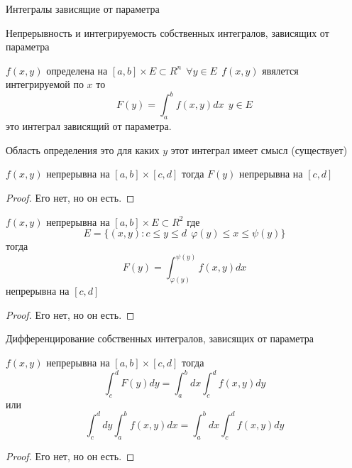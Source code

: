 \begin{title}
  Интегралы зависящие от параметра
\end{title}

\begin{title}[\Large]
  Непрерывность и интегрируемость собственных интегралов, зависящих от
  параметра
\end{title}

\begin{define}
  $f(x,y)$ определена на $[a,b] \times E \subset R^n ~~ \forall y \in E ~~
  f(x,y)$ явялется интегрируемой по $x$ то
  $$
  F(y) = \int_a^b f(x,y) dx ~~ y \in E
  $$
  это интеграл зависящий от параметра.

  Область определения это для каких $y$ этот интеграл имеет смысл (существует)
\end{define}

\begin{theorem}
  $f(x,y)$ непрерывна на $[a,b] \times [c,d]$ тогда $F(y)$ непрерывна
  на $[c,d]$
\end{theorem}

\begin{proof}
  Его нет, но он есть.
\end{proof}

\begin{theorem}
  $f(x,y)$ непрерывна на $[a,b] \times E \subset R^2$ где
  $$
  E = \{ (x,y): c \le y \le d ~~ \varphi(y) \le x \le \psi(y) \}
  $$
  тогда
  $$
  F(y) = \int_{\varphi(y)}^{\psi(y)} f(x,y) dx
  $$
  непрерывна на $[c,d]$
\end{theorem}

\begin{proof}
  Его нет, но он есть.
\end{proof}

\begin{title}[\Large]
  Дифференцирование собственных интегралов, зависящих от параметра
\end{title}

\begin{theorem}
  $f(x,y)$ непрерывна на $[a,b] \times [c,d]$ тогда
  $$
  \int_c^d F(y) dy = \int_a^b dx \int_c^d f(x,y) dy
  $$
  или
  $$
  \int_c^d dy \int_a^b f(x,y) dx = \int_a^b dx \int_c^d f(x,y) dy
  $$
\end{theorem}

\begin{proof}
  Его нет, но он есть.
\end{proof}

